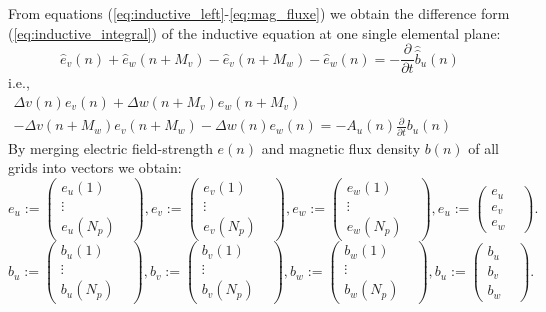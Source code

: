 From equations (\ref{eq:inductive_left}-\ref{eq:mag_fluxe}) we obtain the difference form (\ref{eq:inductive_integral}) of the inductive equation at one single elemental plane:
\begin{equation}
\widehat{e}_{v}(n)+\widehat{e}_{w}(n+M_{v})-\widehat{e}_{v}(n+M_{w})-\widehat{e}_{w}(n)=-\frac{\partial}{\partial t}\widehat{\widehat{b}}_{u}(n)
\label{eq:inductive_integral}
\end{equation}
i.e.,
\begin{multline}
\Delta v(n)e_{v}(n)+\Delta w(n+M_{v})e_{w}(n+M_{v})\\
-\Delta v(n+M_{w})e_{v}(n+M_{w})-\Delta w(n)e_{w}(n)=-A_{u}(n)\frac{\partial}{\partial{t}}b_{u}(n) \hspace{5cm}
\label{eq:inductive_sample}
\end{multline}
By merging electric field-strength $e(n)$ and magnetic flux density $b(n)$ of all grids into vectors we obtain:
\begin{equation}
e_{u}:=
\begin{pmatrix}
e_{u}(1)&\\
\vdots&\\
e_{u}(N_{p})&
\end{pmatrix},
e_{v}:=
\begin{pmatrix}
e_{v}(1)&\\
\vdots&\\
e_{v}(N_{p})&
\end{pmatrix},
e_{w}:=
\begin{pmatrix}
e_{w}(1)&\\
\vdots&\\
e_{w}(N_{p})&
\end{pmatrix},
e_{u}:=
\begin{pmatrix}
e_{u}&\\
e_{v}&\\
e_{w}&
\end{pmatrix}.
\label{eq:vector_e_field}
\end{equation}
\begin{equation}
b_{u}:=
\begin{pmatrix}
b_{u}(1)&\\
\vdots&\\
b_{u}(N_{p})&
\end{pmatrix},
b_{v}:=
\begin{pmatrix}
b_{v}(1)&\\
\vdots&\\
b_{v}(N_{p})&
\end{pmatrix},
b_{w}:=
\begin{pmatrix}
b_{w}(1)&\\
\vdots&\\
b_{w}(N_{p})&
\end{pmatrix},
b_{u}:=
\begin{pmatrix}
b_{u}&\\
b_{v}&\\
b_{w}&
\end{pmatrix}.
\label{eq:vector_m_flux_density}
\end{equation}
